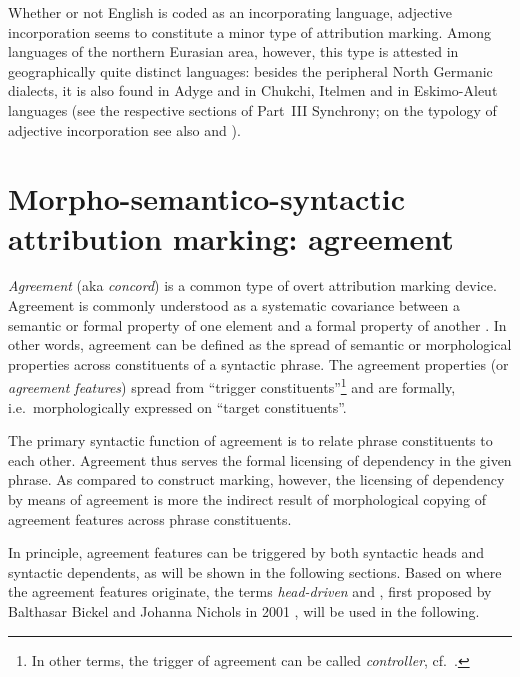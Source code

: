 Whether or not English is coded as an incorporating language, adjective incorporation seems to constitute a minor type of attribution marking. Among languages of the northern Eurasian area, however, this type is attested in geographically quite distinct languages: besides the peripheral North Germanic dialects, it is also found in Adyge and in Chukchi, Itelmen and in Eskimo-Aleut languages (see the respective sections of Part~III Synchrony; on the typology of adjective incorporation see also \cite[225–236]{dahl2004a} and \cite[28–29]{dahl2015a}).

\section[Agreement marking]{Morpho-semantico-syntactic attribution marking: agreement}

\emph{Agreement} (aka \emph{concord}) is a common type of overt attribution marking device. Agreement is commonly understood as a systematic covariance between a semantic or formal property of one element and a formal property of another \cite[610]{steele1978}. In other words, agreement can be defined as the spread of semantic or morphological properties across constituents of a syntactic phrase. The agreement properties (or \emph{agreement features}) spread from “trigger constituents”\footnote{In other terms, the trigger of agreement can be called \emph{controller}, cf.~\citealt{corbett2006}.} and are formally, i.e.~morphologically expressed on “target constituents”.

The primary syntactic function of agreement is to relate phrase constituents to each other. Agreement thus serves the formal licensing of dependency in the given phrase. As compared to construct marking, however, the licensing of dependency by means of agreement is more the indirect result of morphological copying of agreement features across phrase constituents.

In principle, agreement features can be triggered by both syntactic heads and syntactic dependents, as will be shown in the following sections. Based on where the agreement features originate, the terms \emph{head\hyp{}driven} and \emph{}, first proposed by Balthasar Bickel and Johanna Nichols in 2001 \citep[published as][]{bickel-etal2007}, will be used in the following.

